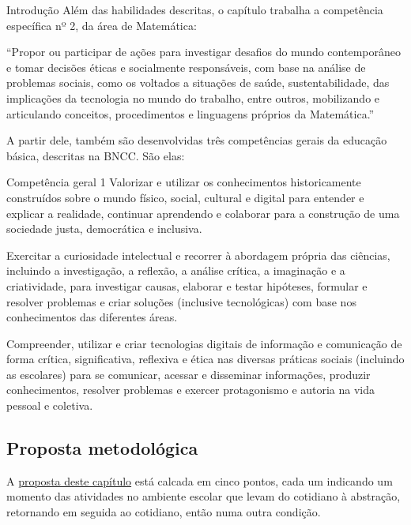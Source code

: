 \begin{apresentacao}{Introdução}
Além das habilidades descritas, o capítulo trabalha a competência específica nº 2, da área de Matemática:

“Propor ou participar de ações para investigar desafios do mundo contemporâneo e tomar decisões éticas e socialmente responsáveis, com base na análise de problemas sociais, como os voltados a situações de saúde, sustentabilidade, das implicações da tecnologia no mundo do trabalho, entre outros, mobilizando e articulando conceitos, procedimentos e linguagens próprios da Matemática.”

A partir dele, também são desenvolvidas três competências gerais da educação básica, descritas na BNCC. São elas:

\begin{habilities}{Competência geral 1}
Valorizar e utilizar os conhecimentos historicamente construídos sobre o mundo físico, social, cultural e digital para entender e explicar a realidade, continuar aprendendo e colaborar para a construção de uma sociedade justa, democrática e inclusiva. 

Exercitar a curiosidade intelectual e recorrer à abordagem própria das ciências, incluindo a investigação, a reflexão, a análise crítica, a imaginação e a criatividade, para investigar causas, elaborar e testar hipóteses, formular e resolver problemas e criar soluções (inclusive tecnológicas) com base nos conhecimentos das diferentes áreas.

Compreender, utilizar e criar tecnologias digitais de informação e comunicação de forma crítica, significativa, reflexiva e ética nas diversas práticas sociais (incluindo as escolares) para se comunicar, acessar e disseminar informações, produzir conhecimentos, resolver problemas e exercer protagonismo e autoria na vida pessoal e coletiva.
\end{habilities}

\subsection{Proposta metodológica}
A \hyperref[etapas-metodologicas]{proposta deste capítulo} está calcada em cinco pontos, cada um indicando um momento das atividades no ambiente escolar que levam do cotidiano à abstração, retornando em seguida ao cotidiano, então numa outra condição.



\end{apresentacao}
